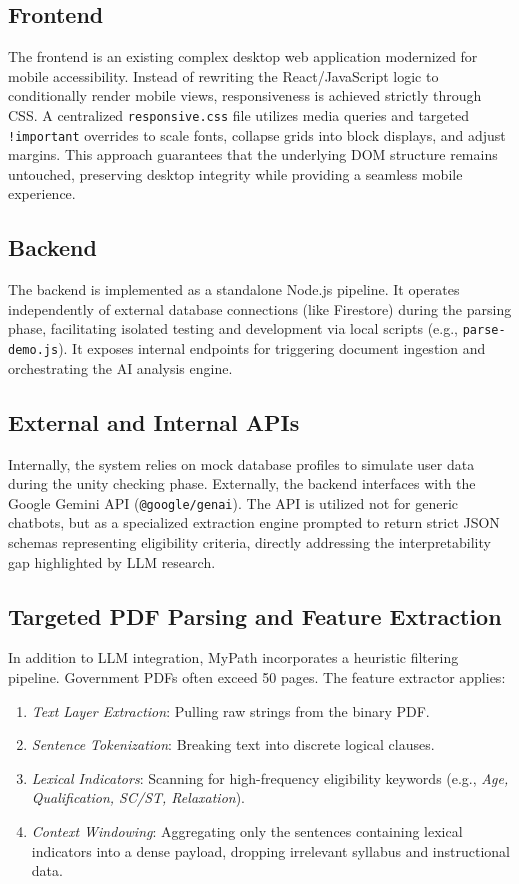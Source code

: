 \documentclass[conference]{IEEEtran}
\begin{document}
\subsection{Frontend}
The frontend is an existing complex desktop web application modernized for mobile accessibility. Instead of rewriting the React/JavaScript logic to conditionally render mobile views, responsiveness is achieved strictly through CSS. A centralized \texttt{responsive.css} file utilizes media queries and targeted \texttt{!important} overrides to scale fonts, collapse grids into block displays, and adjust margins. This approach guarantees that the underlying DOM structure remains untouched, preserving desktop integrity while providing a seamless mobile experience.

\subsection{Backend}
The backend is implemented as a standalone Node.js pipeline. It operates independently of external database connections (like Firestore) during the parsing phase, facilitating isolated testing and development via local scripts (e.g., \texttt{parse-demo.js}). It exposes internal endpoints for triggering document ingestion and orchestrating the AI analysis engine.

\subsection{External and Internal APIs}
Internally, the system relies on mock database profiles to simulate user data during the unity checking phase. Externally, the backend interfaces with the Google Gemini API (\texttt{@google/genai}). The API is utilized not for generic chatbots, but as a specialized extraction engine prompted to return strict JSON schemas representing eligibility criteria, directly addressing the interpretability gap highlighted by LLM research.

\subsection{Targeted PDF Parsing and Feature Extraction}
In addition to LLM integration, MyPath incorporates a heuristic filtering pipeline. Government PDFs often exceed 50 pages. The feature extractor applies:
\begin{enumerate}
    \item \textit{Text Layer Extraction}: Pulling raw strings from the binary PDF.
    \item \textit{Sentence Tokenization}: Breaking text into discrete logical clauses.
    \item \textit{Lexical Indicators}: Scanning for high-frequency eligibility keywords (e.g., \textit{Age, Qualification, SC/ST, Relaxation}).
    \item \textit{Context Windowing}: Aggregating only the sentences containing lexical indicators into a dense payload, dropping irrelevant syllabus and instructional data.
\end{enumerate}
\end{document}
